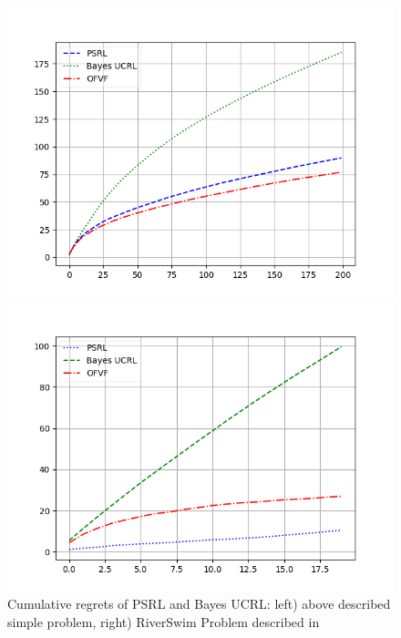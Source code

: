 \documentclass{article}
\begin{document}
\begin{figure}[H]
	\centering
	\begin{minipage}[c]{.45\columnwidth}
		\centering
		\includegraphics[width=\linewidth]{figures/SimpleProblem_PSRL_BayesUCRL_OFVF.png}
	\end{minipage}%
	\begin{minipage}[c]{.45\columnwidth}
		\centering
		\includegraphics[width=\linewidth]{figures/RiverSwim_RSVF_BAYESUCB_PSRL.png}
	\end{minipage}%
	\caption{Cumulative regrets of PSRL and Bayes UCRL: left) above described simple problem, right) RiverSwim Problem described in \citep{Osband2013}}
	\label{fig:dirichlet_result}
\end{figure}
\end{document}
